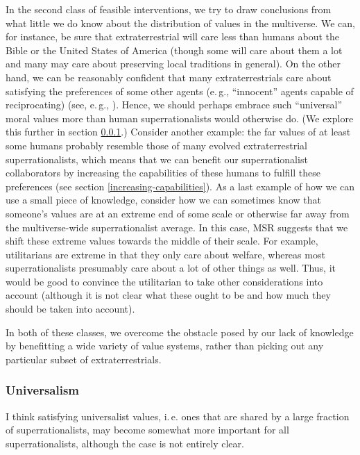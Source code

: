 In the second class of feasible interventions, we try to draw
conclusions from what little we do know about the distribution of values
in the multiverse. We can, for instance, be sure that extraterrestrial
will care less than humans about the Bible or the United States of
America (though some will care about them a lot and many may care about
preserving local traditions in general). On the other hand, we can be
reasonably confident that many extraterrestrials care about satisfying
the preferences of some other agents (e.\,g., ``innocent'' agents capable
of reciprocating) (see, e.\,g.,
\cite{Axelrod2006-ci,Trivers1971-rb,Fehr1999-pd,Dawkins1976-cd,Taylor1987-wn,Buss2015-kp}).
Hence, we should perhaps embrace such ``universal'' moral values more
than human superrationalists would otherwise do. (We explore this
further in section
\ref{universalism}.) Consider
another example: the far values of at least some humans probably
resemble those of many evolved extraterrestrial superrationalists, which
means that we can benefit our superrationalist collaborators by
increasing the capabilities of these humans to fulfill these preferences
(see section
\ref{increasing-capabilities}). As a last example of how we can use a small piece of
knowledge, consider how we can sometimes know that someone's values are
at an extreme end of some scale or otherwise far away from the
multiverse-wide superrationalist average. In this case, MSR suggests
that we shift these extreme values towards the middle of their scale.
For example, utilitarians are extreme in that they only care about
welfare, whereas most superrationalists presumably care about a lot of
other things as well. Thus, it would be good to convince the utilitarian
to take other considerations into account (although it is not clear what
these ought to be and how much they should be taken into account).

In both of these classes, we overcome the obstacle posed by our lack of
knowledge by benefitting a wide variety of value systems, rather than
picking out any particular subset of extraterrestrials.

\hypertarget{universalism}{\subsubsection{Universalism}\label{universalism}}

I think satisfying universalist values, i.\,e. ones that are shared by a
large fraction of superrationalists, may become somewhat more important
for all superrationalists, although the case is not entirely clear.

